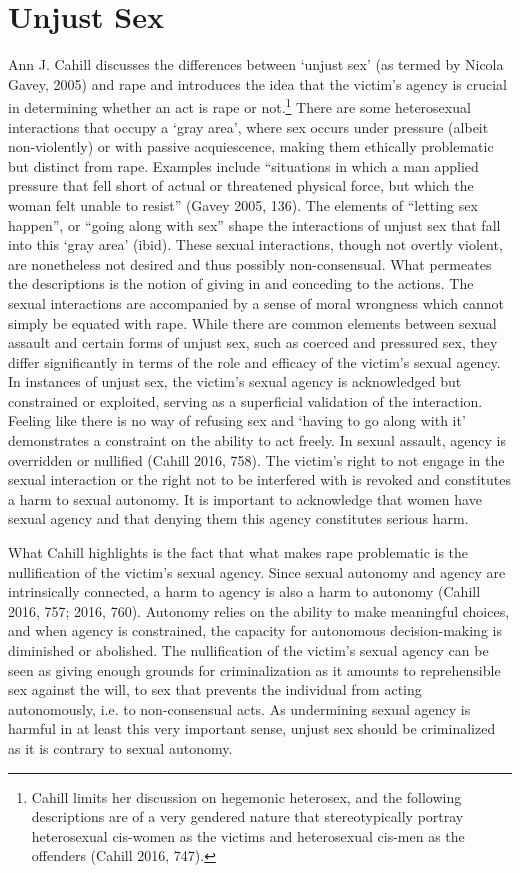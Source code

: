 \section*{Unjust Sex}
Ann J. Cahill discusses the differences between `unjust sex' (as termed
by Nicola Gavey, 2005) and rape and introduces the idea that the
victim's agency is crucial in determining whether an act is rape or
not.\footnote{Cahill limits her discussion on hegemonic heterosex, and
  the following descriptions are of a very gendered nature that
  stereotypically portray heterosexual cis-women as the victims and
  heterosexual cis-men as the offenders (Cahill 2016, 747).} There are
some heterosexual interactions that occupy a `gray area', where sex
occurs under pressure (albeit non-violently) or with passive
acquiescence, making them ethically problematic but distinct from rape.
Examples include ``situations in which a man applied pressure that fell
short of actual or threatened physical force, but which the woman felt
unable to resist'' (Gavey 2005, 136). The elements of ``letting sex
happen'', or ``going along with sex'' shape the interactions of unjust
sex that fall into this `gray area' (ibid). These sexual interactions,
though not overtly violent, are nonetheless not desired and thus
possibly non-consensual. What permeates the descriptions is the notion
of giving in and conceding to the actions. The sexual interactions are
accompanied by a sense of moral wrongness which cannot simply be equated
with rape. While there are common elements between sexual assault and
certain forms of unjust sex, such as coerced and pressured sex, they
differ significantly in terms of the role and efficacy of the victim's
sexual agency. In instances of unjust sex, the victim's sexual agency is
acknowledged but constrained or exploited, serving as a superficial
validation of the interaction. Feeling like there is no way of refusing
sex and `having to go along with it' demonstrates a constraint on the
ability to act freely. In sexual assault, agency is overridden or
nullified (Cahill 2016, 758). The victim's right to not engage in the
sexual interaction or the right not to be interfered with is revoked and
constitutes a harm to sexual autonomy. It is important to acknowledge
that women have sexual agency and that denying them this agency
constitutes serious harm.

What Cahill highlights is the fact that what makes rape problematic is
the nullification of the victim's sexual agency. Since sexual autonomy
and agency are intrinsically connected, a harm to agency is also a harm
to autonomy (Cahill 2016, 757; 2016, 760). Autonomy relies on the
ability to make meaningful choices, and when agency is constrained, the
capacity for autonomous decision-making is diminished or abolished. The
nullification of the victim's sexual agency can be seen as giving enough
grounds for criminalization as it amounts to reprehensible sex against
the will, to sex that prevents the individual from acting autonomously,
i.e. to non-consensual acts. As undermining sexual agency is harmful in
at least this very important sense, unjust sex should be criminalized as
it is contrary to sexual autonomy.

